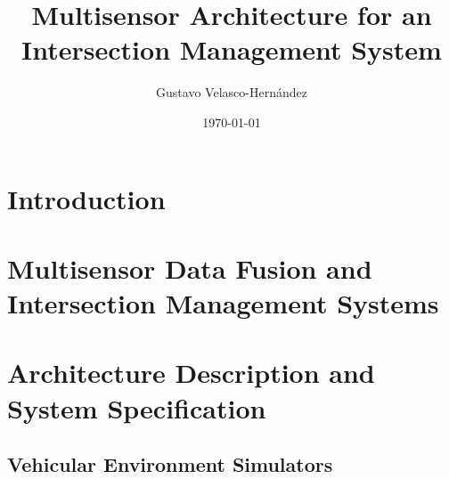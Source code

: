 \documentclass{book}
\begin{document}
\title{Multisensor Architecture for an Intersection Management System}
\vfill
\vfill
\vfill
\author{Gustavo Velasco-Hernández}
\vfill
\vfill
\vfill
\date{\today}
\maketitle

\tableofcontents
\setcounter{tocdepth}{3}

\chapter {Introduction}


\chapter [Sensor Fusion and IMS]{Multisensor Data Fusion and Intersection Management Systems}


\chapter {Architecture Description and System Specification}


\begin{appendices}
	\chapter {Vehicular Environment Simulators}
	
\end{appendices}



%
\end{document}
